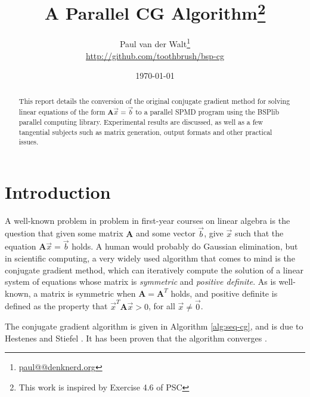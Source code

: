 \documentclass[a4paper]{article}
\author{Paul van der Walt\footnote{\url{paul@@denknerd.org}}\\ \url{http://github.com/toothbrush/bsp-cg}}
\date{\today}
\title{A Parallel CG Algorithm\footnote{This work is inspired by Exercise 4.6 of PSC\cite{bisseling2004parallel}}}
\newcommand{\ve}[1]{\ensuremath{\vec{#1}}}
\newcommand{\mat}[1]{\ensuremath{\boldsymbol{#1}}}
\begin{document}
\maketitle

\begin{abstract}
    This report details the conversion of the original conjugate gradient method for
    solving linear equations of the form $\mat A \ve x = \ve b$ to a parallel SPMD program
    using the BSPlib parallel computing library. Experimental results are discussed, as well
    as a few tangential subjects such as matrix generation, output formats and other practical
    issues.
\end{abstract}

\section{Introduction}

A well-known problem in problem in first-year courses on linear algebra is the question that
given some matrix \mat{A} and some vector \ve{b}, give \ve{x} such that the equation $\mat A \ve x = \ve b$ holds. A human would probably do Gaussian elimination, but
in scientific computing, a very widely used algorithm that comes to mind is the conjugate gradient method, which can iteratively compute the solution of a linear system of equations whose matrix is \emph{symmetric} and \emph{positive definite}.
As is well-known, a matrix is symmetric when $\mat A = \mat A^T$ holds, and positive definite is defined as the property that $\ve x^T \mat A \ve x > 0$, for all $\ve x \neq \ve 0$.

The conjugate gradient algorithm is given in Algorithm \ref{alg:seq-cg}, and is due to Hestenes and Stiefel \cite{hestenes1952methods}. It has been proven that the algorithm converges \cite{golub1996matrix}.
\end{document}

